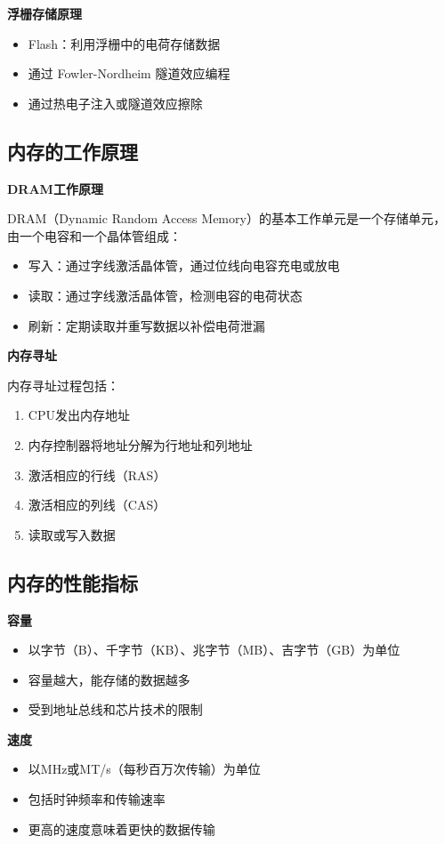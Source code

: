 \documentclass{article}
\begin{document}
\textbf{浮栅存储原理}
\begin{itemize}
    \item Flash：利用浮栅中的电荷存储数据
    \item 通过 Fowler-Nordheim 隧道效应编程
    \item 通过热电子注入或隧道效应擦除
\end{itemize}

\subsection{内存的工作原理}

\textbf{DRAM工作原理}

DRAM（Dynamic Random Access Memory）的基本工作单元是一个存储单元，由一个电容和一个晶体管组成：

\begin{itemize}
    \item 写入：通过字线激活晶体管，通过位线向电容充电或放电
    \item 读取：通过字线激活晶体管，检测电容的电荷状态
    \item 刷新：定期读取并重写数据以补偿电荷泄漏
\end{itemize}

\textbf{内存寻址}

内存寻址过程包括：
\begin{enumerate}
    \item CPU发出内存地址
    \item 内存控制器将地址分解为行地址和列地址
    \item 激活相应的行线（RAS）
    \item 激活相应的列线（CAS）
    \item 读取或写入数据
\end{enumerate}

\subsection{内存的性能指标}

\textbf{容量}
\begin{itemize}
    \item 以字节（B）、千字节（KB）、兆字节（MB）、吉字节（GB）为单位
    \item 容量越大，能存储的数据越多
    \item 受到地址总线和芯片技术的限制
\end{itemize}

\textbf{速度}
\begin{itemize}
    \item 以MHz或MT/s（每秒百万次传输）为单位
    \item 包括时钟频率和传输速率
    \item 更高的速度意味着更快的数据传输
\end{itemize}
\end{document}
